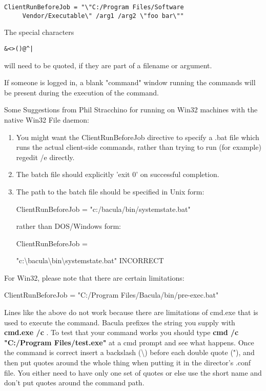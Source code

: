 \begin{description}
\footnotesize
\begin{verbatim}
ClientRunBeforeJob = "\"C:/Program Files/Software
     Vendor/Executable\" /arg1 /arg2 \"foo bar\""
\end{verbatim}
\normalsize

   The special characters 
\begin{verbatim}
&<>()@^|
\end{verbatim}
   will need to be quoted,
   if they are part of a filename or argument.
   
   If someone is logged in, a blank "command" window running the commands
   will be present during the execution of the command.
   
   Some Suggestions from Phil Stracchino for running on Win32 machines with
   the native Win32 File daemon:

   \begin{enumerate}
   \item You might want the ClientRunBeforeJob directive to specify a .bat
      file which runs the actual client-side commands, rather than trying
      to run (for example) regedit /e directly.
   \item The batch file should explicitly 'exit 0' on successful completion.  
   \item The path to the batch file should be specified in Unix form:  
   
      ClientRunBeforeJob = "c:/bacula/bin/systemstate.bat"  
   
   rather than DOS/Windows form:  
   
   ClientRunBeforeJob =

"c:\textbackslash{}bacula\textbackslash{}bin\textbackslash{}systemstate.bat"
   INCORRECT 
   \end{enumerate}

For Win32, please note that there are certain limitations:  

ClientRunBeforeJob = "C:/Program Files/Bacula/bin/pre-exec.bat"

Lines like the above do not work because there are limitations of
cmd.exe that is used to execute the command.
Bacula prefixes the string you supply with {\bf cmd.exe /c }.  To test that
your command works you should type {\bf cmd /c "C:/Program Files/test.exe"} at a
cmd prompt and see what happens.  Once the command is correct insert a
backslash (\textbackslash{}) before each double quote ("), and
then put quotes around the whole thing when putting it in
the director's .conf file.  You either need to have only one set of quotes
or else use the short name and don't put quotes around the command path.
 

\end{description}
